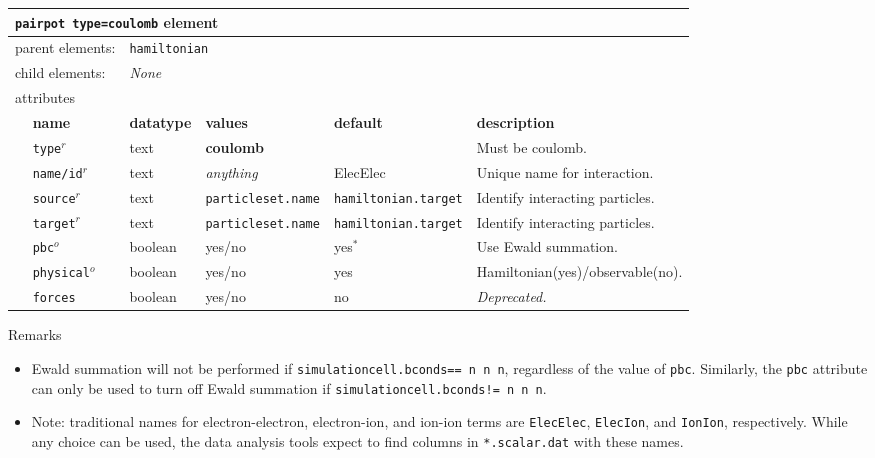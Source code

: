 \FloatBarrier
\begin{table}[h]
\begin{center}
\begin{tabularx}{\textwidth}{l l l l l l }
\hline
\multicolumn{6}{l}{\texttt{pairpot type=coulomb} element} \\
\hline
\multicolumn{2}{l}{parent elements:} & \multicolumn{4}{l}{\texttt{hamiltonian}}\\
\multicolumn{2}{l}{child  elements:} & \multicolumn{4}{l}{\textit{None}}\\
\multicolumn{2}{l}{attributes}  & \multicolumn{4}{l}{}\\
   &   \bfseries name     & \bfseries datatype & \bfseries values & \bfseries default   & \bfseries description \\
   & \texttt{type}$^r$    &  text              & \textbf{coulomb} &                     & Must be coulomb.         \\
   & \texttt{name/id}$^r$ &  text              & \textit{anything}&  ElecElec           & Unique name for interaction. \\
   & \texttt{source}$^r$  &  text              & \texttt{particleset.name} &\texttt{hamiltonian.target}& Identify interacting particles.\\
   & \texttt{target}$^r$  &  text              & \texttt{particleset.name} &\texttt{hamiltonian.target}& Identify interacting particles.  \\
   & \texttt{pbc}$^o$     &  boolean           & yes/no           & yes$^*$             & Use Ewald summation.  \\
   & \texttt{physical}$^o$&  boolean           & yes/no           & yes                 & Hamiltonian(yes)/observable(no). \\
   & \texttt{forces}      &  boolean           & yes/no           & no                  & \textit{Deprecated.}             \\
  \hline
\end{tabularx}
\end{center}
\end{table}
\FloatBarrier

Remarks
\begin{itemize}
  \item{Ewald summation will not be performed if \texttt{simulationcell.bconds== n n n}, regardless of the value of \texttt{pbc}.  Similarly, the \texttt{pbc} attribute can only be used to turn off Ewald summation if \texttt{simulationcell.bconds!= n n n}.}
  \item{Note: traditional names for electron-electron, electron-ion, and ion-ion terms are \texttt{ElecElec}, \texttt{ElecIon}, and \texttt{IonIon}, respectively.  While any choice can be used, the data analysis tools expect to find columns in \texttt{*.scalar.dat} with these names.}
\end{itemize}


